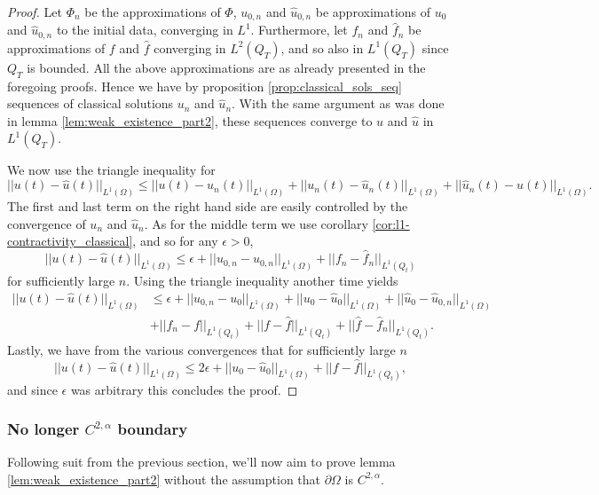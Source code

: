 \documentclass[11pt, a4paper]{article}
\begin{document}
\begin{proof}
Let $\Phi_n$ be the approximations of $\Phi$, $u_{0,n}$ and $\hat{u}_{0,n}$ be approximations of $u_0$ and $\hat{u}_{0,n}$ to the initial data, converging in $L^1$. Furthermore, let $f_n$ and $\hat{f}_n$ be approximations of $f$ and $\hat{f}$ converging in $L^2(Q_T)$, and so also in $L^1(Q_T)$ since $Q_T$ is bounded. All the above approximations are as already presented in the foregoing proofs. Hence we have by proposition \ref{prop:classical_sols_seq} sequences of classical solutions $u_n$ and $\hat{u}_n$. With the same argument as was done in lemma \ref{lem:weak_existence_part2}, these sequences converge to $u$ and $\hat{u}$ in $L^1(Q_T)$.

We now use the triangle inequality for
\begin{equation*}
||u(t) - \hat{u}(t)||_{L^1(\Omega)} \leq ||u(t) - u_n(t)||_{L^1(\Omega)} + ||u_n(t) - \hat{u}_n(t)||_{L^1(\Omega)} + ||\hat{u}_n(t) - \hat{u}(t)||_{L^1(\Omega)}.
\end{equation*}
The first and last term on the right hand side are easily controlled by the convergence of $u_n$ and $\hat{u}_n$. As for the middle term we use corollary \ref{cor:l1-contractivity_classical}, and so for any $\epsilon > 0$,
\begin{equation*}
||u(t) - \hat{u}(t)||_{L^1(\Omega)} \leq \epsilon + ||u_{0,n} - \hat{u}_{0,n}||_{L^1(\Omega)} + ||f_n - \hat{f}_n||_{L^1(Q_t)}
\end{equation*}
for sufficiently large $n$.
Using the triangle inequality another time yields
\begin{align*}
||u(t) - \hat{u}(t)||_{L^1(\Omega)} &\leq \epsilon + ||u_{0,n} - u_0||_{L^1(\Omega)} + ||u_0 - \hat{u}_0||_{L^1(\Omega)} + ||\hat{u}_0 -\hat{u}_{0,n}||_{L^1(\Omega)} \\
&+ ||f_n - f||_{L^1(Q_t)} + ||f - \hat{f}||_{L^1(Q_t)} + ||\hat{f}-\hat{f}_n||_{L^1(Q_t)}.
\end{align*}
Lastly, we have from the various convergences that for sufficiently large $n$  
\begin{equation*}
||u(t) - \hat{u}(t)||_{L^1(\Omega)} \leq 2\epsilon + ||u_0 - \hat{u}_0||_{L^1(\Omega)} + ||f - \hat{f}||_{L^1(Q_t)}, 
\end{equation*}
and since $\epsilon$ was arbitrary this concludes the proof.
\end{proof}

\subsubsection{No longer $C^{2,\alpha}$ boundary}
Following suit from the previous section, we'll now aim to prove lemma \ref{lem:weak_existence_part2} without the assumption that $\partial \Omega$ is $C^{2,\alpha}$.
\end{document}
